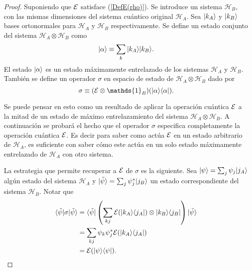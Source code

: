 \begin{proof}
Suponiendo que $\mathcal{E}$ satisface ({\ref{DefE(rho)}}). Se introduce un sistema
$\mathcal{H}_B$, con las mismas dimensiones del sistema cuántico original
$\mathcal{H}_A$. Sea $|k_A\rangle$ y $|k_B\rangle$  bases ortonormales para $\mathcal{H}_A$ y $\mathcal{H}_B$
respectivamente. Se define un estado conjunto del sistema $\mathcal{H}_A\otimes
\mathcal{H}_B$ como \[|\alpha\rangle \equiv \sum_k |k_A\rangle |k_B\rangle.\] El estado
$|\alpha\rangle $ es un estado máximamente entrelazado de los sistemas
$\mathcal{H}_A$ y $\mathcal{H}_B$. También se define un operador $\sigma$ en
espacio de estado de $\mathcal{H}_A\otimes \mathcal{H}_B$ dado por 
\begin{equation}\label{sigma1}
    \sigma \equiv (\E\otimes\mathds{1}_B)(|\alpha\rala \alpha|).
\end{equation}


Se puede pensar en esto como un resultado de aplicar la operación cuántica $\mathcal{E}$
a la mitad de un estado de máximo entrelazamiento del sistema
$\mathcal{H}_A\otimes \mathcal{H}_B$. A continuación se probará el hecho que el operador $\sigma$ especifica completamente la operación cuántica $\mathcal{E}$. Es decir para saber como actúa $\mathcal{E}$ en un estado arbitrario de $\mathcal{H}_A$, es suficiente con saber cómo este actúa en un solo estado máximamente entrelazado de $\mathcal{H}_A$ con otro sistema. 

La estrategia que permite recuperar a $\mathcal{E}$ de $\sigma$ es la siguiente. Sea $|\psi\rangle=\sum_j \psi_j |j_A\rangle$ algún estado del sistema $\mathcal{H}_A$ y $|\tilde{\psi}\rangle = \sum_j \psi_j^*|j_B\rangle$ un estado correspondiente del sistema $\mathcal{H}_B$. Notar que
\begin{equation}
    \begin{split}
        \langle \tilde \psi |\sigma |\tilde{\psi}\rangle&= \langle \tilde \psi |\left(\sum_{kj} \mathcal{E} (|k_A \rangle \langle j_A|)\otimes |k_B\rangle \langle j_B|\right) |\tilde{\psi}\rangle\\
        &=\sum_{kj} \psi_k \psi_j^* \mathcal{E} (|k_A \rangle \langle j_A|)\\
        &=\mathcal{E}(|\psi\rangle \langle\psi|).
    \end{split}
\end{equation}


\end{proof}
